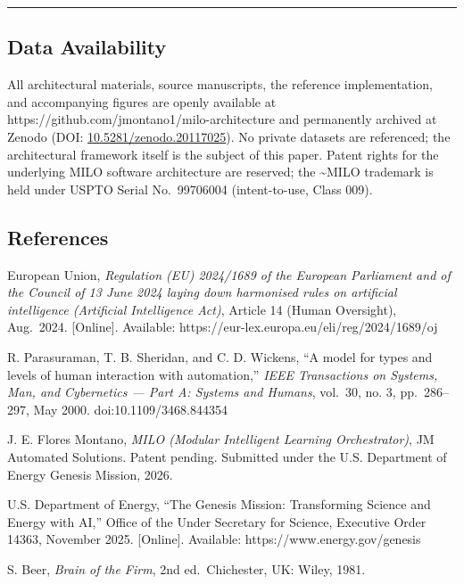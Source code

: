 \begin{center}\rule{0.5\linewidth}{0.5pt}\end{center}

\subsection{Data Availability}\label{data-availability}

All architectural materials, source manuscripts, the reference
implementation, and accompanying figures are openly available at
https://github.com/jmontano1/milo-architecture and permanently archived
at Zenodo (DOI:
\href{https://doi.org/10.5281/zenodo.20117025}{10.5281/zenodo.20117025}).
No private datasets are referenced; the architectural framework itself
is the subject of this paper. Patent rights for the underlying MILO
software architecture are reserved; the \textasciitilde MILO trademark
is held under USPTO Serial No.~99706004 (intent-to-use, Class 009).

\subsection{References}\label{references}

\cite{ref1} European Union, \emph{Regulation (EU) 2024/1689 of the European
Parliament and of the Council of 13 June 2024 laying down harmonised
rules on artificial intelligence (Artificial Intelligence Act)}, Article
14 (Human Oversight), Aug.~2024. {[}Online{]}. Available:
https://eur-lex.europa.eu/eli/reg/2024/1689/oj

\cite{ref2} R. Parasuraman, T. B. Sheridan, and C. D. Wickens, ``A model for
types and levels of human interaction with automation,'' \emph{IEEE
Transactions on Systems, Man, and Cybernetics --- Part A: Systems and
Humans}, vol.~30, no. 3, pp.~286--297, May 2000. doi:10.1109/3468.844354

\cite{ref3} J. E. Flores Montano, \emph{MILO (Modular Intelligent Learning
Orchestrator)}, JM Automated Solutions. Patent pending. Submitted under
the U.S. Department of Energy Genesis Mission, 2026.

\cite{ref4} U.S. Department of Energy, ``The Genesis Mission: Transforming
Science and Energy with AI,'' Office of the Under Secretary for Science,
Executive Order 14363, November 2025. {[}Online{]}. Available:
https://www.energy.gov/genesis

\cite{ref5} S. Beer, \emph{Brain of the Firm}, 2nd ed.~Chichester, UK:
Wiley, 1981.

